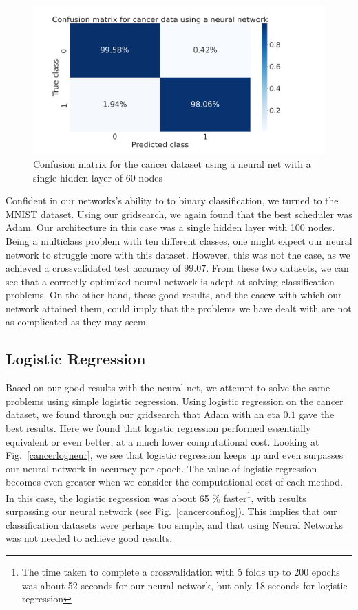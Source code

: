 \documentclass[onecolumn,10pt,cleanfoot]{asme2ej}
\begin{document}
\begin{figure}[h]
\centerline{\includegraphics[width=5in]{figure/cancerconf.png}}
\caption{Confusion matrix for the cancer dataset using a neural net with a single hidden layer of 60 nodes}
\label{verification}
\end{figure}

Confident in our networks's ability to to binary classification, we turned to the MNIST dataset. Using our gridsearch, we again found that the best scheduler was Adam. Our architecture in this case was a single hidden layer with 100 nodes. Being a multiclass problem with ten different classes, one might expect our neural network to struggle more with this dataset. However, this was not the case, as we achieved a crossvalidated test accuracy of $99.07$. From these two datasets, we can see that a correctly optimized neural network is adept at solving classification problems. On the other hand, these good results, and the easew with which our network attained them, could imply that the problems we have dealt with are not as complicated as they may seem.

\subsection{Logistic Regression}

Based on our good results with the neural net, we attempt to solve the same problems using simple logistic regression. Using logistic regression on the cancer dataset, we found through our gridsearch that Adam with an eta $0.1$ gave the best results. Here we found that logistic regression performed essentially equivalent or even better, at a much lower computational cost. Looking at Fig.~\ref{cancerlogneur}, we see that logistic regression keeps up and even surpasses our neural network in accuracy per epoch. The value of logistic regression becomes even greater when we consider the computational cost of each method. In this case, the logistic regression was about 65 \% faster\footnote{The time taken to complete a crossvalidation with 5 folds up to 200 epochs was about 52 seconds for our neural network, but only 18 seconds for logistic regression}, with results surpassing our neural network (see Fig.~\ref{cancerconflog}). This implies that our classification datasets were perhaps too simple, and that using Neural Networks was not needed to achieve good results.
\end{document}
